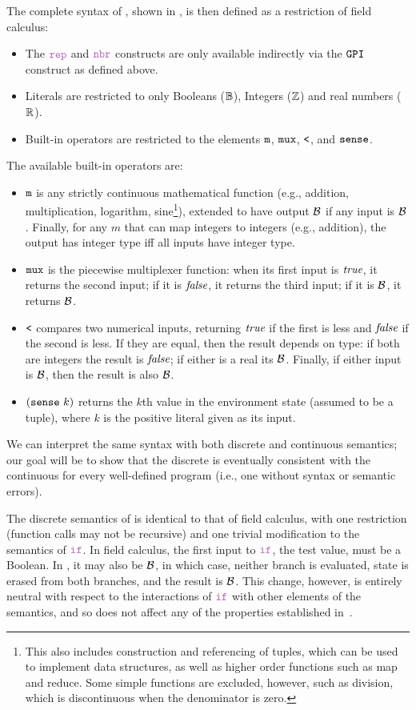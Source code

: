 \documentclass[12pt,a4paper,twoside,openright]{book}
\begin{document}
The complete syntax of \calculus{}, shown in , is then defined as a restriction of field calculus:
\begin{itemize}
\item The $\repN$ and $\nbrN$ constructs are only available indirectly via the $\texttt{GPI}$ construct as defined above.
\item Literals are restricted to only Booleans ($\Boolean$), Integers ($\Integer$) and real numbers ($\Real$).
\item Built-in operators are restricted to the elements $\texttt{m}$, $\texttt{mux}$, $\texttt{<}$, and $\texttt{sense}$.
\end{itemize}
The available built-in operators are:
\begin{itemize}
\item $\texttt{m}$ is any strictly continuous mathematical function (e.g., addition, multiplication, logarithm, sine\footnote{This also includes construction and referencing of tuples, which can be used to implement data structures, as well as higher order functions such as map and reduce.  Some simple functions are excluded, however, such as division, which is discontinuous when the denominator is zero.}), extended to have output $\mathcal{B}$ if any input is $\mathcal{B}$.  Finally, for any $m$ that can map integers to integers (e.g., addition), the output has integer type iff all inputs have integer type.
%
\item $\texttt{mux}$ is the piecewise multiplexer function: when its first input is $\textit{true}$, it returns the second input; if it is $\textit{false}$, it returns the third input; if it is $\mathcal{B}$, it returns $\mathcal{B}$.
%
\item $\texttt{<}$ compares two numerical inputs, returning $\textit{true}$ if the first is less and $\textit{false}$ if the second is less.  If they are equal, then the result depends on type: if both are integers the result is $\textit{false}$; if either is a real its $\mathcal{B}$.  Finally, if either input is $\mathcal{B}$, then the result is also $\mathcal{B}$.
%
\item $(\texttt{sense}~k)$ returns the $k$th value in the environment state (assumed to be a tuple), where $k$ is the positive literal given as its input.
\end{itemize}
We can interpret the same syntax with both discrete and continuous semantics; our goal will be to show that the discrete is eventually consistent with the continuous for every well-defined program (i.e., one without syntax or semantic errors).

The discrete semantics of \calculus{} is identical to that of field calculus, with one restriction (function calls may not be recursive) and one trivial modification to the semantics of $\ifN$.
%
In field calculus, the first input to $\ifN$, the test value, must be a Boolean.
%
In \calculus{}, it may also be $\mathcal{B}$, in which case, neither branch is evaluated, state is erased from both branches, and the result is $\mathcal{B}$.
%
This change, however, is entirely neutral with respect to the interactions of $\ifN$ with other elements of the semantics, and so does not affect any of the properties established in~\cite{VDB-FOCLASA-CIC2013}.
\end{document}
